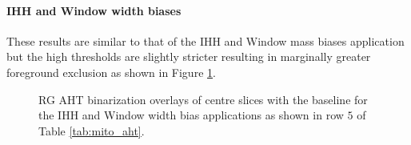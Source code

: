 \paragraph{IHH and Window width biases}
These results are similar to that of the IHH and Window mass biases application but the high thresholds are slightly stricter resulting in marginally greater foreground exclusion as shown in Figure \ref{fig:mito_aht_bias_plus_width}.

\begin{figure}[h!]
	\centering
	\caption[RG AHT binarization overlays of centre slices with the baseline for the IHH and Window width bias applications]{RG AHT binarization overlays of centre slices with the baseline for the IHH and Window width bias applications as shown in row $5$ of Table \ref{tab:mito_aht}.}
	\label{fig:mito_aht_bias_plus_width}
\end{figure}
\FloatBarrier
